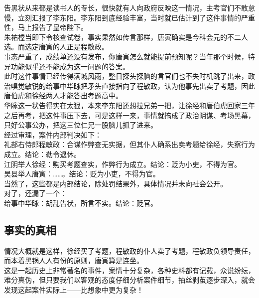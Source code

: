 \begin{multicols}{\theparacolNo}
告黑状从来都是读书人的专长，很快就有人向政府反映这一情况，主考官们不敢怠慢，立刻汇报了李东阳。李东阳到底经验丰富，当时就已估计到了这件事情的严重性，马上报告了皇帝陛下。\\

朱祐樘当即下令核查试卷，事实果然如传言那样，唐寅确实是今科会元的不二人选。而选定唐寅的人正是程敏政。\\

事态严重了，成绩单还没有发布，你唐寅怎么就能提前预知呢？当年那个时候，特异功能似乎还不能成为这一问题的答案。\\

此时这件事情已经传得满城风雨，整日探头探脑的言官们也不失时机跳了出来，政治嗅觉敏锐的给事中华眿把矛头直接指向了程敏政，认为他事先出卖了考题，因此唐伯虎和徐经两人才能答出考题高中。\\

华眿这一状告得实在太狠，本来李东阳还想拉兄弟一把，让徐经和唐伯虎回家三年之后再考，把这件事压下去，可是这样一来，事情就搞成了政治阴谋、考场黑幕，只好公事公办，把这三位仁兄一股脑儿抓了进来。\\

经过审理，案件内部判决如下：\\

礼部右侍郎程敏政：合谋作弊查无实据，但其仆人确系出卖考题给徐经，失察行为成立。结论：勒令退休。\\

江阴举人徐经：购买考题查实，作弊行为成立。结论：贬为小吏，不得为官。\\

吴县举人唐寅：……。结论：贬为小吏，不得为官。\\

当然了，这些都是内部结论，除处罚结果外，具体情况并未向社会公开。\\

对了，还漏了一个：\\

给事中华眿：胡乱告状，所言不实。结论：贬官。\\

\subsection{事实的真相}
情况大概就是这样，徐经买了考题，程敏政的仆人卖了考题，程敏政负领导责任，而本着黑锅人人有份的原则，唐寅算是连坐。\\

这是一起历史上非常著名的事件，案情十分复杂，各种史料都有记载，众说纷纭，难分真伪，但只要我们以客观的态度仔细分析案件细节，抽丝剥茧逐步深入，就会发现这起案件实际上——比想象中更为复杂！\\


\end{multicols}
